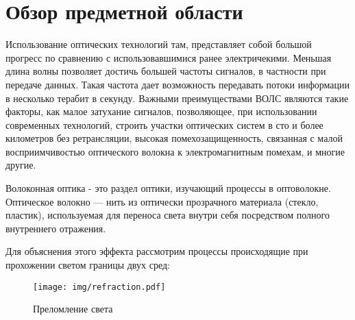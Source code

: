 \chapter{Обзор предметной области}
Использование оптических технологий там, представляет собой большой прогресс по сравнению с использовавшимися ранее электричекими. Меньшая длина волны позволяет достичь большей частоты сигналов, в частности при передаче данных. Такая частота дает возможность передавать потоки информации в несколько терабит в секунду. Важными преимуществами ВОЛС являются такие факторы, как малое затухание сигналов, позволяющее, при использовании современных технологий, строить участки оптических систем в сто и более километров без ретрансляции, высокая помехозащищенность, связанная с малой восприимчивостью оптического волокна к электромагнитным помехам, и многие другие.

Волоконная оптика - это раздел оптики, изучающий процессы в оптоволокне. Оптическое волокно — нить из оптически прозрачного материала (стекло, пластик), используемая для переноса света внутри себя посредством полного внутреннего отражения.

Для объяснения этого эффекта рассмотрим процессы происходящие при прохожении светом границы двух сред:

\begin{figure}
\texttt{[image: img/refraction.pdf]}
\caption{Преломление света}
\end{figure}